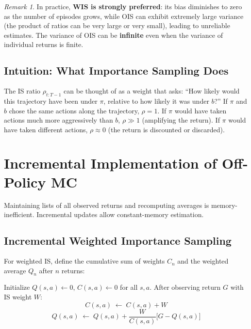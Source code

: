 \documentclass[11pt,a4paper]{article}
\theoremstyle{definition}
\theoremstyle{plain}
\theoremstyle{remark}
\newtheorem*{remark}{Remark}
\begin{document}
\begin{remark}
In practice, \textbf{WIS is strongly preferred}: its bias diminishes to zero as the number of episodes grows, while OIS can exhibit extremely large variance (the product of ratios can be very large or very small), leading to unreliable estimates. The variance of OIS can be \textbf{infinite} even when the variance of individual returns is finite.
\end{remark}

\subsection{Intuition: What Importance Sampling Does}

The IS ratio $\rho_{t:T-1}$ can be thought of as a weight that asks: ``How likely would this trajectory have been under $\pi$, relative to how likely it was under $b$?'' If $\pi$ and $b$ chose the same actions along the trajectory, $\rho = 1$. If $\pi$ would have taken actions much more aggressively than $b$, $\rho \gg 1$ (amplifying the return). If $\pi$ would have taken different actions, $\rho \approx 0$ (the return is discounted or discarded).

\section{Incremental Implementation of Off-Policy MC}

Maintaining lists of all observed returns and recomputing averages is memory-inefficient. Incremental updates allow constant-memory estimation.

\subsection{Incremental Weighted Importance Sampling}

For weighted IS, define the cumulative sum of weights $C_n$ and the weighted average $Q_n$ after $n$ returns:

\begin{tcolorbox}[colback=blue!5!white, colframe=blue!60!black, title={Incremental WIS Update}]
Initialize $Q(s, a) \leftarrow 0$, $C(s, a) \leftarrow 0$ for all $s, a$. After observing return $G$ with IS weight $W$:
\[
    C(s, a) \;\leftarrow\; C(s, a) + W
\]
\[
    Q(s, a) \;\leftarrow\; Q(s, a) + \frac{W}{C(s, a)}\bigl[G - Q(s, a)\bigr]
\]
\end{tcolorbox}
\end{document}
